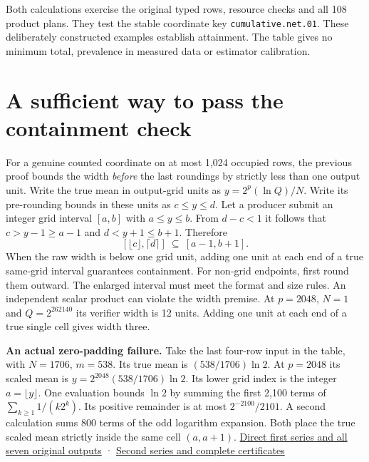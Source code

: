 Both calculations exercise the original typed rows, resource checks and all 108 product plans. They test the stable coordinate key \texttt{cumulative.net.01}. These deliberately constructed examples establish attainment. The table gives no minimum total, prevalence in measured data or estimator calibration.

\clearpage

\section{A sufficient way to pass the containment check}\label{a-sufficient-way-to-pass-the-containment-check}

For a genuine counted coordinate on at most 1,024 occupied rows, the previous proof bounds the width \emph{before} the last roundings by strictly less than one output unit. Write the true mean in output-grid units as \(y=2^p(\ln Q)/N\). Write its pre-rounding bounds in these units as \(c\le y\le d\). Let a producer submit an integer grid interval \([a,b]\) with \(a\le y\le b\). From \(d-c<1\) it follows that \(c>y-1\ge a-1\) and \(d<y+1\le b+1\). Therefore \[
 [\lfloor c\rfloor,\lceil d\rceil]\ \subseteq\ [a-1,b+1].
\] When the raw width is below one grid unit, adding one unit at each end of a true same-grid interval guarantees containment. For non-grid endpoints, first round them outward. The enlarged interval must meet the format and size rules. An independent scalar product can violate the width premise. At \(p=2048\), \(N=1\) and \(Q=2^{262140}\) its verifier width is 12 units. Adding one unit at each end of a true single cell gives width three.

\textbf{An actual zero-padding failure.} Take the last four-row input in the table, with \(N=1706\), \(m=538\). Its true mean is \((538/1706)\ln2\). At \(p=2048\) its scaled mean is \(y=2^{2048}(538/1706)\ln2\). Its lower grid index is the integer \(a=\lfloor y\rfloor\). One evaluation bounds \(\ln2\) by summing the first 2,100 terms of \(\sum_{k\ge1}1/(k2^k)\). Its positive remainder is at most \(2^{-2100}/2101\). A second calculation sums 800 terms of the odd logarithm expansion. Both place the true scaled mean strictly inside the same cell \((a,a+1)\). \href{https://github.com/sepahead/pid-rs/blob/main/audit/research/signed-log-certificate-enclosure/numerical/padding.json}{Direct first series and all seven original outputs} · \href{https://github.com/sepahead/pid-rs/blob/main/audit/research/signed-log-certificate-enclosure/counted-examples/TRUE-CELLS.json}{Second series and complete certificates}

